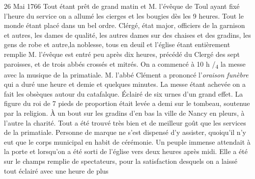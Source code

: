 \begin{diary}{26 Mai 1766}{}
                         Tout étant prêt de grand matin et
                              M.
                              l'évêque de Toul
                           ayant fixé l'heure du service
                           on a allumé les cierges et les bougies
                           dès les 9 heures. Tout le monde étant placé
                           dans un bel ordre. Clérgé, état major, officiers
                           de la garnison et autres, les dames de qualité,
                           les autres dames sur des chaises et des
                           gradins, les gens de robe et autre,la
                           noblesse, tous en deuil et l’église étant
                           entièrement remplie M.
                              l'évêque est entré
                           peu après dix heures, précédé du Clergé des
                           sept paroisses, et de trois abbés crossés et
                           mitrés. On a commencé à 10 h /\textsubscript{4} la
                           messe avec la musique de la primatiale.
                           M. l'abbé Clément a
                           prononcé l'\emph{oraison funèbre}
                           qui a duré une heure et demie et quelques
                           minutes. La messe étant achevée on
                           a fait les obsèques autour du catafalque.
                           Éclairé de six urnes d'un grand effet.
                           La figure du roi de 7 pieds de proportion
                           était levée a demi sur le tombeau, soutenue
                           par la religion. À un bout sur les gradins d'en bas la ville de Nancy en pleurs, à l'autre
                           la charité. Tout a été trouvé très bien
                           et de meilleur goût que les services de la
                           primatiale. Personne de marque ne s'est
                           dispensé d'y assister, quoiqu'il n'y eut que
                           le corps municipal en habit de cérémonie.
                           Un peuple immense attendait à la porte
                           et lorsqu'on a été sorti de l’église vers
                           deux heures après midi. Elle a été sur le
                           champs remplie de spectateurs, pour la
                           satisfaction desquels on a laissé tout
                           éclairé avec une heure de plus \bigskip
        
        
                     \end{diary}

